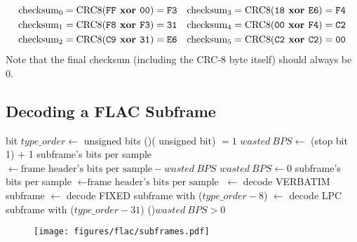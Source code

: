 \begin{align*}
\text{checksum}_0 = \text{CRC8}(\texttt{FF}\textbf{ xor }\texttt{00}) = \texttt{F3} & &
\text{checksum}_3 = \text{CRC8}(\texttt{18}\textbf{ xor }\texttt{E6}) = \texttt{F4} \\
\text{checksum}_1 = \text{CRC8}(\texttt{F8}\textbf{ xor }\texttt{F3}) = \texttt{31} & &
\text{checksum}_4 = \text{CRC8}(\texttt{00}\textbf{ xor }\texttt{F4}) = \texttt{C2} \\
\text{checksum}_2 = \text{CRC8}(\texttt{C9}\textbf{ xor }\texttt{31}) = \texttt{E6} & &
\text{checksum}_5 = \text{CRC8}(\texttt{C2}\textbf{ xor }\texttt{C2}) = \texttt{00} \\
\end{align*}
Note that the final checksum (including the CRC-8 byte itself)
should always be 0.

\clearpage

\subsection{Decoding a FLAC Subframe}
 bit\;
$type\_order \leftarrow$  unsigned bits\;
\eIf(){( unsigned bit) $ = 1$}{
  $wasted~BPS \leftarrow$ (\UNARY stop bit 1) + 1\;
  subframe's bits per sample $\leftarrow \text{frame header's bits per sample} - wasted~BPS$\;
}{
  $wasted~BPS \leftarrow 0$\;
  subframe's bits per sample $\leftarrow \text{frame header's bits per sample}$\;
}
 {
  \SAMPLES $\leftarrow$ decode VERBATIM subframe\;
}
 {
  \SAMPLES $\leftarrow$ decode FIXED subframe with \ORDER ($type\_order - 8$)\;
}
 {
  \SAMPLES $\leftarrow$ decode LPC subframe with \ORDER ($type\_order - 31$)\;
}
\If(){$wasted~BPS > 0$}{
}
\Return \SAMPLES\;
\EALGORITHM
\begin{figure}[h]
\texttt{[image: figures/flac/subframes.pdf]}
\end{figure}

